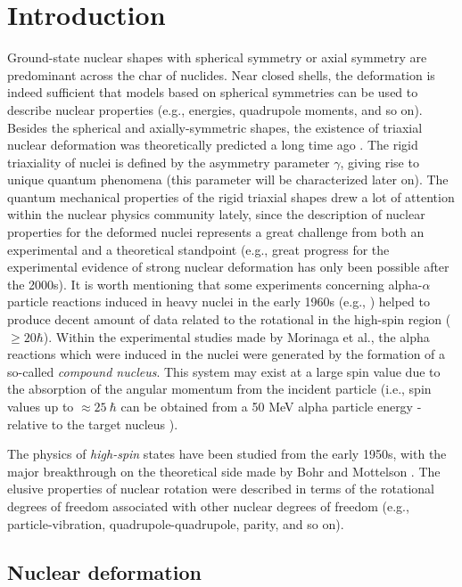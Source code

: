 \chapter{Introduction}

Ground-state nuclear shapes with spherical symmetry or axial symmetry are predominant across the char of nuclides. Near closed shells, the deformation is indeed sufficient that models based on spherical symmetries can be used to describe nuclear properties (e.g., energies, quadrupole moments, and so on). Besides the spherical and axially-symmetric shapes, the existence of triaxial nuclear deformation was theoretically predicted a long time ago \cite{bohr1998nuclear}. The rigid triaxiality of nuclei is defined by the asymmetry parameter $\gamma$, giving rise to unique quantum phenomena (this parameter will be characterized later on). The quantum mechanical properties of the rigid triaxial shapes drew a lot of attention within the nuclear physics community lately, since the description of nuclear properties for the deformed nuclei represents a great challenge from both an experimental and a theoretical standpoint (e.g., great progress for the experimental evidence of strong nuclear deformation has only been possible after the 2000s). It is worth mentioning that some experiments concerning alpha-$\alpha$ particle reactions induced in heavy nuclei in the early 1960s (e.g., \cite{morinaga1963gamma}) helped to produce decent amount of data related to the rotational in the high-spin region ($\geq 20 \hbar$). Within the experimental studies made by Morinaga et al., the alpha reactions which were induced in the nuclei were generated by the formation of a so-called \emph{compound nucleus}. This system may exist at a large spin value due to the absorption of the angular momentum from the incident particle (i.e., spin values up to $\approx25\ \hbar$ can be obtained from a 50 MeV alpha particle energy - relative to the target nucleus \cite{morinaga1963gamma}).

The physics of \emph{high-spin} states have been studied from the early 1950s, with the major breakthrough on the theoretical side made by Bohr and Mottelson \cite{bohr1998nuclear}. The elusive properties of nuclear rotation were described in terms of the rotational degrees of freedom associated with other nuclear degrees of freedom (e.g., particle-vibration, quadrupole-quadrupole, parity, and so on). 

\section{Nuclear deformation}

